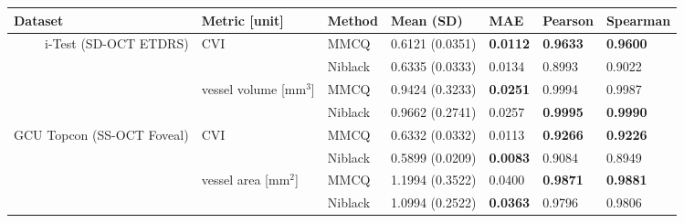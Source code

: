 
\begin{tabular}{rp{2cm}lllll}
\toprule
\multicolumn{1}{l}{Dataset} & Metric {[}unit{]} & Method & Mean (\acrshort{SD}) & \acrshort{MAE} & Pearson & Spearman  \\ 
\midrule
\multirow{4}{1.75cm}{i-Test (\acrshort{SD-OCT} \acrshort{ETDRS})} & \multirow{2}{2cm}{\acrshort{CVI}} & \acrshort{MMCQ} & 0.6121 (0.0351) & \textbf{0.0112} & \textbf{0.9633} & \textbf{0.9600} \\
 &  & Niblack & 0.6335 (0.0333) & 0.0134 & 0.8993 & 0.9022\\ \cmidrule(l){2-7} 
 & \multirow{2}{2.75cm}{vessel volume {[}mm$^3${]}} & \acrshort{MMCQ} & 0.9424 (0.3233) & \textbf{0.0251} & 0.9994 & 0.9987 \\
 &  & Niblack & 0.9662 (0.2741) & 0.0257 & \textbf{0.9995} & \textbf{0.9990} \\ 
 \midrule
\multirow{4}{1.75cm}{\acrshort{GCU} Topcon (\acrshort{SS-OCT} Foveal)} & \multirow{2}{2cm}{\acrshort{CVI}} & \acrshort{MMCQ} & 0.6332 (0.0332) & 0.0113 & \textbf{0.9266} & \textbf{0.9226} \\
 &  & Niblack & 0.5899 (0.0209) & \textbf{0.0083} & 0.9084 & 0.8949\\ \cmidrule(l){2-7} 
 & \multirow{2}{2.25cm}{vessel area {[}mm$^2${]}} & \acrshort{MMCQ} & 1.1994 (0.3522) & 0.0400 & \textbf{0.9871} & \textbf{0.9881} \\
 &  & Niblack & 1.0994 (0.2522) & \textbf{0.0363} & 0.9796 & 0.9806 \\ 
 \bottomrule
\end{tabular}
